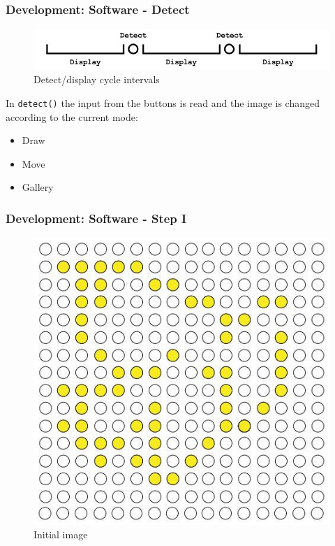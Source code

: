 \documentclass{beamer}
\begin{document}
\begin{frame}
\frametitle{Development: Software - Detect}

\begin{figure}
	\includegraphics[scale=0.3]{images/detect_display.jpg}
	\caption{Detect/display cycle intervals}
\end{figure}

In {\tt detect()} the input from the buttons is read and the image is changed according to the current mode:
\begin{itemize}
	\item Draw
	\item Move
	\item Gallery
\end{itemize}

\end{frame}

\begin{frame}
\frametitle{Development: Software - Step I }

\begin{figure}
	\includegraphics[scale=0.4]{images/example_1.jpg}
	\caption{Initial image}
\end{figure}

\end{frame}
\end{document}
